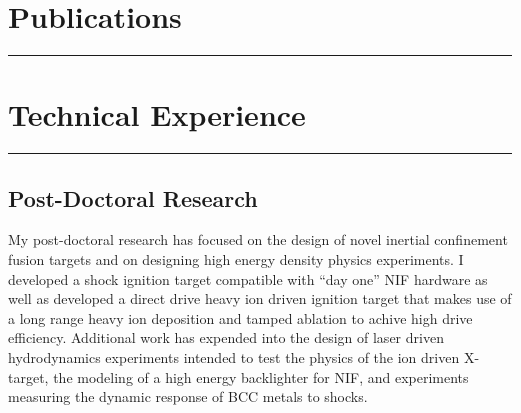 \documentclass[letterpaper,11pt]{article}
\begin{document}


\section*{Publications}
\hrule
\vspace{0.05in}













\section*{Technical Experience}
\hrule
\vspace{0.05in}

\subsection*{Post-Doctoral Research}
My post-doctoral research has focused on the design of novel inertial
confinement fusion targets and on designing high energy density physics
experiments.  I developed a shock ignition target compatible with ``day one''
NIF hardware as well as developed a direct drive heavy ion driven ignition
target that makes use of a long range heavy ion deposition and tamped ablation
to achive high drive efficiency.  Additional work has expended into the design
of laser driven hydrodynamics experiments intended to test the physics of the
ion driven X-target, the modeling of a high energy backlighter for NIF, and
experiments measuring the dynamic response of BCC metals to shocks.
\end{document}
